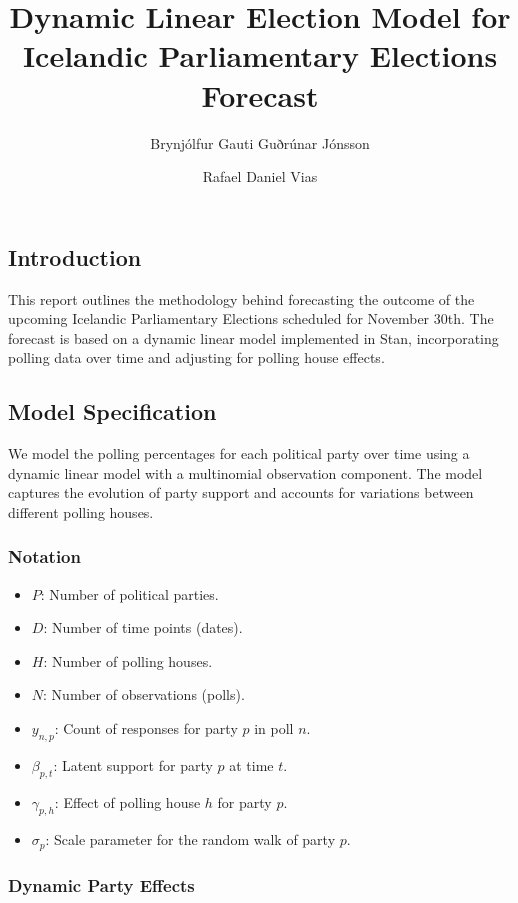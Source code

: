 \documentclass[
  letterpaper,
  DIV=11,
  numbers=noendperiod]{scrartcl}
\title{Dynamic Linear Election Model for Icelandic Parliamentary
Elections Forecast}
\author{Brynjólfur Gauti Guðrúnar Jónsson \and Rafael Daniel Vias}
\date{}
\providecommand{\tightlist}{%
  \setlength{\itemsep}{0pt}\setlength{\parskip}{0pt}}\usepackage{longtable,booktabs,array}
\begin{document}
\maketitle


\subsection{Introduction}\label{introduction}

This report outlines the methodology behind forecasting the outcome of
the upcoming Icelandic Parliamentary Elections scheduled for November
30th. The forecast is based on a dynamic linear model implemented in
Stan, incorporating polling data over time and adjusting for polling
house effects.

\subsection{Model Specification}\label{model-specification}

We model the polling percentages for each political party over time
using a dynamic linear model with a multinomial observation component.
The model captures the evolution of party support and accounts for
variations between different polling houses.

\subsubsection{Notation}\label{notation}

\begin{itemize}
\tightlist
\item
  \(P\): Number of political parties.
\item
  \(D\): Number of time points (dates).
\item
  \(H\): Number of polling houses.
\item
  \(N\): Number of observations (polls).
\item
  \(y_{n,p}\): Count of responses for party \(p\) in poll \(n\).
\item
  \(\beta_{p,t}\): Latent support for party \(p\) at time \(t\).
\item
  \(\gamma_{p,h}\): Effect of polling house \(h\) for party \(p\).
\item
  \(\sigma_p\): Scale parameter for the random walk of party \(p\).
\end{itemize}

\subsubsection{Dynamic Party Effects}\label{dynamic-party-effects}
\end{document}
